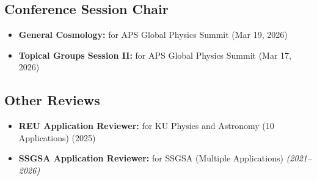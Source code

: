 \documentclass[10pt]{report}
\begin{document}
\subsection*{Conference Session Chair}
\begin{itemize}

    \item {\bf General Cosmology:} for APS Global Physics Summit (Mar 19, 2026)

    \vspace{0.0em}
    \noindent  
    \item {\bf Topical Groups Session II:} for APS Global Physics Summit (Mar 17, 2026)

\end{itemize}

\subsection*{Other Reviews}
\begin{itemize}

    \item {\bf REU Application Reviewer:} for KU Physics and Astronomy (10 Applications) (2025)

    \vspace{0.0em}
    \noindent  
    \item {\bf SSGSA Application Reviewer:} for SSGSA (Multiple Applications) \textit{(2021--2026)}

\end{itemize}


\end{document}
